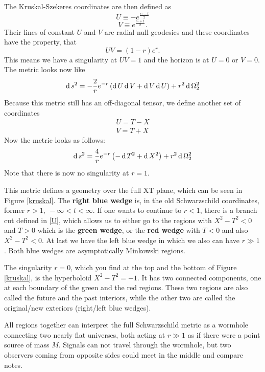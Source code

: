 	The Kruskal-Szekeres coordinates are then defined as
		\begin{equation}
			U\equiv -e^{\frac{r_*-t}{2}} \label{U}
		\end{equation}
		\begin{equation}
			V\equiv e^{\frac{r_*+t}{2}}.
		\end{equation}
	Their lines of constant $U$ and $V$ are radial null geodesics and these coordinates have the property, that
		\begin{equation}
			 UV=(1-r)e^r.
		\end{equation}
	This means we have a singularity at $UV=1$ and the horizon is at $U=0$ or $V=0$. The metric looks now like
		\begin{equation}
			\operatorname{d} s^2=-\frac{2}{r}e^{-r}\left(\operatorname{d} U \operatorname{d} V + \operatorname{d} V \operatorname{d} U\right)+r^2 \operatorname{d} \Omega^2_{2}
		\end{equation}
	Because this metric still has an off-diagonal tensor, we define another set of coordinates
		\begin{equation}
		\begin{split}
			U=T-X 	\\	
			V=T+X
		\end{split}
		\end{equation}
	Now the metric looks as follows:
		\begin{equation}\label{SchXT}
			\operatorname{d} s^2=\frac{4}{r}e^{-r}\left(- \operatorname{d} T^2+ \operatorname{d} X^2\right)+r^2 \operatorname{d} \Omega^2_2
		\end{equation}
	Note that there is now no singularity at $r=1$.
	
	This metric defines a geometry over the full XT plane, which can be seen in Figure \ref{kruskal}. The \textbf{right {\color{blue} blue} wedge} is, in the old Schwarzschild coordinates, former $r>1,~-\infty<t<\infty$. If one wants to continue to $r<1$, there is a branch cut  defined in \eqref{U}, which allows us to either go to the regions with $X^2-T^2<0$ and $T>0$ which is the \textbf{{\color{forestgreen} green} wedge}, or the \textbf{{\color{red} red} wedge} with $T<0$ and also $X^2-T^2<0$. At last we have the left {\color{blue} blue} wedge in which we also can have $r\gg1$. Both blue wedges are asymptotically Minkowski regions. 
	
	The singularity $r=0$, which you find at the top and the bottom of Figure \ref{kruskal}, is the hyperboloid $X^2-T^2=-1$. It has two connected components, one at each boundary of the {\color{forestgreen} green} and the {\color{red} red} regions. These two regions are also called the {\color{forestgreen} future} and the {\color{red} past} interiors, while the other two are called the original/new exteriors (right/left {\color{blue} blue} wedges).
	
	All regions together can interpret the full Schwarzschild metric as a wormhole connecting two nearly flat universes, both acting at $r\gg1$ as if there were a point source of mass $M$. Signals can not travel through the wormhole, but two observers coming from opposite sides could meet in the middle and compare notes. 
